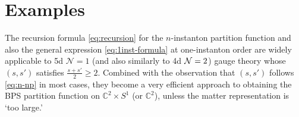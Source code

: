 \documentclass[letterpaper, 11pt]{article}
\def\IC{\mathbb{C}}
\def\CN{{\cal N}}
\begin{document}
{%






\section{Examples} \label{sec:example}

The recursion formula \eqref{eq:recursion} for the $n$-instanton partition function and also the general expression \eqref{eq:1inst-formula} at one-instanton order are widely applicable to 5d $\mathcal{N}=1$ (and also similarly to 4d $\CN=2$) gauge theory whose $(s,s')$ satisfies $\frac{s+s'}{2}\geq 2$. Combined with the observation that $(s,s')$ follows \eqref{eq:n-np} in most cases, they become a very efficient approach to obtaining the BPS partition function on $\IC^2 \times S^1$ (or $\IC^2$), unless the matter representation is `too large.' 

}
\end{document}

